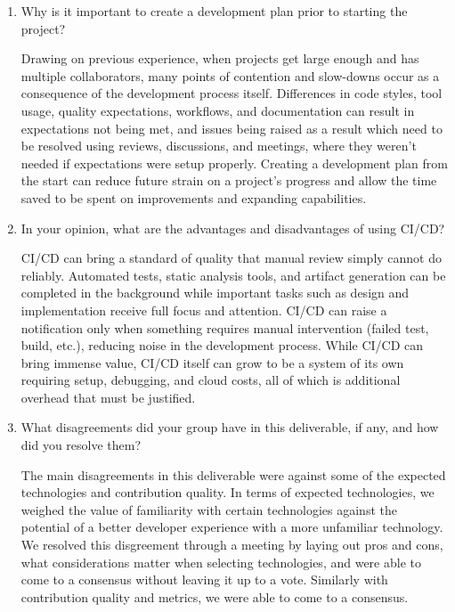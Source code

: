 \documentclass{article}
\begin{document}
\begin{enumerate}
    \item Why is it important to create a development plan prior to starting
          the project?

          Drawing on previous experience, when projects get large enough and
          has multiple collaborators, many points of contention and slow-downs
          occur as a consequence of the development process itself. Differences
          in code styles, tool usage, quality expectations, workflows, and
          documentation can result in expectations not being met, and issues
          being raised as a result which need to be resolved using reviews,
          discussions, and meetings, where they weren't needed if expectations
          were setup properly. Creating a development plan from the start can
          reduce future strain on a project's progress and allow the time saved
          to be spent on improvements and expanding capabilities.

    \item In your opinion, what are the advantages and disadvantages of using
          CI/CD?

          CI/CD can bring a standard of quality that manual review simply
          cannot do reliably. Automated tests, static analysis tools, and
          artifact generation can be completed in the background while
          important tasks such as design and implementation receive full focus
          and attention. CI/CD can raise a notification only when something
          requires manual intervention (failed test, build, etc.), reducing
          noise in the development process. While CI/CD can bring immense
          value, CI/CD itself can grow to be a system of its own requiring
          setup, debugging, and cloud costs, all of which is additional
          overhead that must be justified.

    \item What disagreements did your group have in this deliverable, if any,
          and how did you resolve them?

          The main disagreements in this deliverable were against some of the
          expected technologies and contribution quality. In terms of expected
          technologies, we weighed the value of familiarity with certain
          technologies against the potential of a better developer experience
          with a more unfamiliar technology. We resolved this disgreement
          through a meeting by laying out pros and cons, what considerations
          matter when selecting technologies, and were able to come to a
          consensus without leaving it up to a vote. Similarly with
          contribution quality and metrics, we were able to come to a
          consensus.

\end{enumerate}
\end{document}
